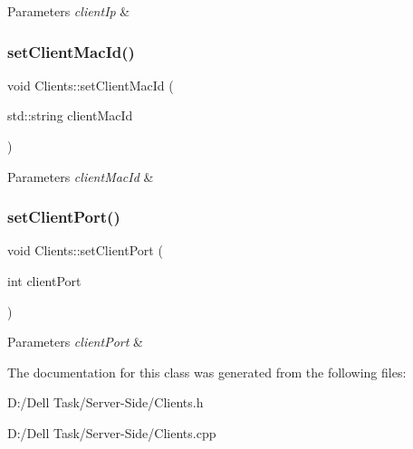 \begin{DoxyParams}{Parameters}
{\em client\+Ip} & \\
\hline
\end{DoxyParams}
\mbox{\label{class_clients_a56877afde8405ca1de35e20d1eed2fc1}} 
\subsubsection{\texorpdfstring{set\+Client\+Mac\+Id()}{setClientMacId()}}
{\footnotesize\ttfamily void Clients\+::set\+Client\+Mac\+Id (\begin{DoxyParamCaption}\item[{std\+::string}]{client\+Mac\+Id }\end{DoxyParamCaption})}






\begin{DoxyParams}{Parameters}
{\em client\+Mac\+Id} & \\
\hline
\end{DoxyParams}
\mbox{\label{class_clients_a4f4a445570f1712dc275c1897794d8a6}} 
\subsubsection{\texorpdfstring{set\+Client\+Port()}{setClientPort()}}
{\footnotesize\ttfamily void Clients\+::set\+Client\+Port (\begin{DoxyParamCaption}\item[{int}]{client\+Port }\end{DoxyParamCaption})}






\begin{DoxyParams}{Parameters}
{\em client\+Port} & \\
\hline
\end{DoxyParams}


The documentation for this class was generated from the following files\+:\begin{DoxyCompactItemize}
\item 
D\+:/\+Dell Task/\+Server-\/\+Side/Clients.\+h\item 
D\+:/\+Dell Task/\+Server-\/\+Side/Clients.\+cpp\end{DoxyCompactItemize}
